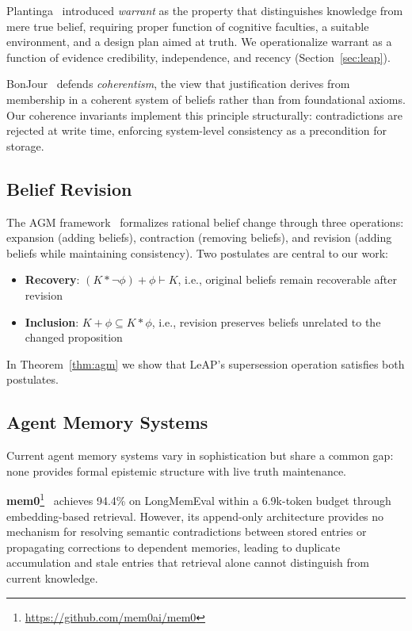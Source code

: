 \documentclass[11pt,letterpaper]{article}
\begin{document}
Plantinga~\cite{plantinga1993} introduced \textit{warrant} as the property that distinguishes knowledge from mere true belief, requiring proper function of cognitive faculties, a suitable environment, and a design plan aimed at truth. We operationalize warrant as a function of evidence credibility, independence, and recency (Section~\ref{sec:leap}).

BonJour~\cite{bonjour1985} defends \textit{coherentism}, the view that justification derives from membership in a coherent system of beliefs rather than from foundational axioms. Our coherence invariants implement this principle structurally: contradictions are rejected at write time, enforcing system-level consistency as a precondition for storage.

\subsection{Belief Revision}

The AGM framework~\cite{agm1985} formalizes rational belief change through three operations: expansion (adding beliefs), contraction (removing beliefs), and revision (adding beliefs while maintaining consistency). Two postulates are central to our work:
\begin{itemize}[noitemsep]
    \item \textbf{Recovery}: $(K * \neg\phi) + \phi \vdash K$, i.e., original beliefs remain recoverable after revision
    \item \textbf{Inclusion}: $K + \phi \subseteq K * \phi$, i.e., revision preserves beliefs unrelated to the changed proposition
\end{itemize}

In Theorem~\ref{thm:agm} we show that LeAP's supersession operation satisfies both postulates.

\subsection{Agent Memory Systems}

Current agent memory systems vary in sophistication but share a common gap: none provides formal epistemic structure with live truth maintenance.

\textbf{mem0}\footnote{\url{https://github.com/mem0ai/mem0}}~\cite{mem0} achieves 94.4\% on LongMemEval within a 6.9k-token budget through embedding-based retrieval. However, its append-only architecture provides no mechanism for resolving semantic contradictions between stored entries or propagating corrections to dependent memories, leading to duplicate accumulation and stale entries that retrieval alone cannot distinguish from current knowledge.
\end{document}
